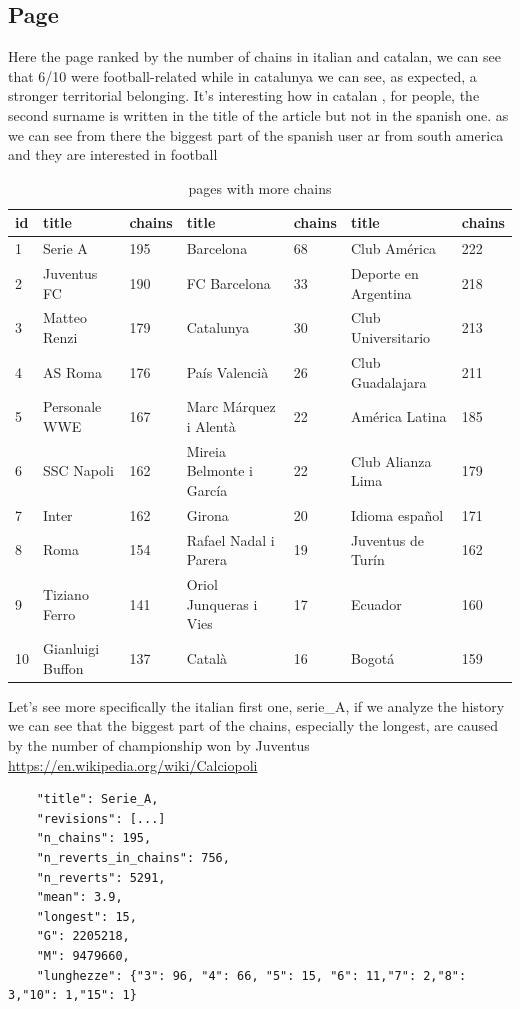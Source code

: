 \subsection{Page}
Here the page ranked by the number of chains in italian and catalan, we can see that 6/10 were
football-related while in catalunya we can see, as expected, a stronger territorial belonging. It's
interesting how in catalan , for people, the second surname is written in the title of the article
but not in the spanish one. as we can see from there the biggest part of the spanish user ar from
south america and they are interested in football
\begin{table}[H]
    \centering
    \begin{tabularx}{\columnwidth}{@{}Xllllll@{}}
        \midrule
        \textbf{id} & \textbf{title} & \textbf{chains}& \textbf{title} & \textbf{chains} & \textbf{title} & \textbf{chains} \\ \toprule
        1 & Serie A & 195  & Barcelona & 68 & Club América & 222\\
        2 & Juventus FC & 190  & FC Barcelona & 33 & Deporte en Argentina & 218\\
        3 & Matteo Renzi & 179  & Catalunya & 30 & Club Universitario & 213\\
        4 & AS Roma & 176  &País Valencià& 26 & Club Guadalajara & 211\\
        5 & Personale WWE & 167  &Marc Márquez i Alentà & 22 & América Latina & 185\\
        6 & SSC Napoli & 162  & Mireia Belmonte i García& 22 & Club Alianza Lima & 179\\
        7 & Inter  & 162  &Girona & 20 & Idioma español & 171\\
        8 & Roma & 154 & Rafael Nadal i Parera & 19 & Juventus de Turín & 162\\
        9 & Tiziano Ferro & 141 & Oriol Junqueras i Vies& 17 & Ecuador & 160\\
        10 & Gianluigi Buffon & 137  &Català & 16 & Bogotá & 159\\
        
         \bottomrule
    \end{tabularx}
    
    \caption{pages with more chains \label{table:chainspage}}
\end{table}


Let's see more specifically the italian first one, serie\_A, if we analyze the history we can see
that the biggest part of the chains, especially the longest, are caused by the number of championship won by Juventus \url{https://en.wikipedia.org/wiki/Calciopoli} 
\begin{verbatim}
    "title": Serie_A,
    "revisions": [...] 
    "n_chains": 195,
    "n_reverts_in_chains": 756,
    "n_reverts": 5291,
    "mean": 3.9,
    "longest": 15,
    "G": 2205218,
    "M": 9479660,
    "lunghezze": {"3": 96, "4": 66, "5": 15, "6": 11,"7": 2,"8": 3,"10": 1,"15": 1}
\end{verbatim}

